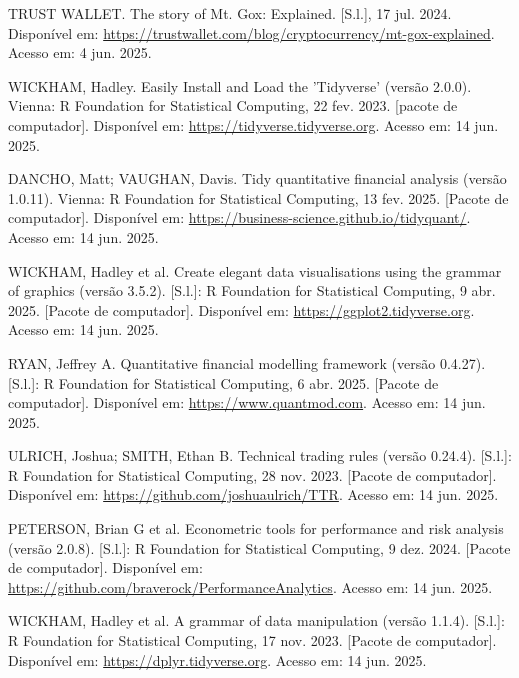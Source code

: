 \begin{thebibliography}{26}
     TRUST WALLET. The story of Mt. Gox: Explained. [S.l.], 17 jul. 2024. Disponível em: 
    \href{https://trustwallet.com/blog/cryptocurrency/mt-gox-explained}{https://trustwallet.com/blog/cryptocurrency/mt-gox-explained}. 
    Acesso em: 4 jun. 2025.
    
     WICKHAM, Hadley. Easily Install and Load the 'Tidyverse' (versão 2.0.0). Vienna: R Foundation for Statistical Computing, 22 fev. 2023. [pacote de computador]. Disponível em: 
    \href{https://tidyverse.tidyverse.org}{https://tidyverse.tidyverse.org}. 
    Acesso em: 14 jun. 2025.
    
     DANCHO, Matt; VAUGHAN, Davis. Tidy quantitative financial analysis (versão 1.0.11). Vienna: R Foundation for Statistical Computing, 13 fev. 2025. [Pacote de computador]. Disponível em: 
    \href{https://business-science.github.io/tidyquant/}{https://business-science.github.io/tidyquant/}. 
    Acesso em: 14 jun. 2025.
    
     WICKHAM, Hadley et al. Create elegant data visualisations using the grammar of graphics (versão 3.5.2). [S.l.]: R Foundation for Statistical Computing, 9 abr. 2025. [Pacote de computador]. Disponível em: 
    \href{https://ggplot2.tidyverse.org}{https://ggplot2.tidyverse.org}. 
    Acesso em: 14 jun. 2025.
    
     RYAN, Jeffrey A. Quantitative financial modelling framework (versão 0.4.27). [S.l.]: R Foundation for Statistical Computing, 6 abr. 2025. [Pacote de computador]. Disponível em: 
    \href{https://www.quantmod.com}{https://www.quantmod.com}. 
    Acesso em: 14 jun. 2025.
    
     ULRICH, Joshua; SMITH, Ethan B. Technical trading rules (versão 0.24.4). [S.l.]: R Foundation for Statistical Computing, 28 nov. 2023. [Pacote de computador]. Disponível em: 
    \href{https://github.com/joshuaulrich/TTR}{https://github.com/joshuaulrich/TTR}. 
    Acesso em: 14 jun. 2025.
    
     PETERSON, Brian G et al. Econometric tools for performance and risk analysis (versão 2.0.8). [S.l.]: R Foundation for Statistical Computing, 9 dez. 2024. [Pacote de computador]. Disponível em: 
    \href{https://github.com/braverock/PerformanceAnalytics}{https://github.com/braverock/PerformanceAnalytics}. 
    Acesso em: 14 jun. 2025.
    
     WICKHAM, Hadley et al. A grammar of data manipulation (versão 1.1.4). [S.l.]: R Foundation for Statistical Computing, 17 nov. 2023. [Pacote de computador]. Disponível em: 
    \href{https://dplyr.tidyverse.org}{https://dplyr.tidyverse.org}.  
    Acesso em: 14 jun. 2025.
    

\end{thebibliography}
